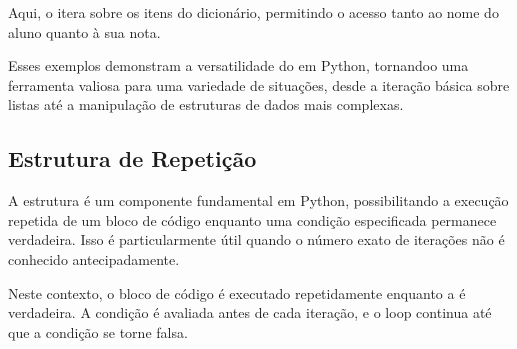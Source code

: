 \documentclass[letterpaper,10pt,english]{jupyterBook}
\begin{document}
\sphinxAtStartPar
Aqui, o  itera sobre os itens do dicionário, permitindo o acesso tanto ao nome do aluno quanto à sua nota.

\sphinxAtStartPar
Esses exemplos demonstram a versatilidade do  em Python, tornando\sphinxhyphen{}o uma ferramenta valiosa para uma variedade de situações, desde a iteração básica sobre listas até a manipulação de estruturas de dados mais complexas.


\subsection{Estrutura de Repetição }
\label{\detokenize{chapters/ch4/ch4:estrutura-de-repeticao-while}}
\sphinxAtStartPar
A estrutura  é um componente fundamental em Python, possibilitando a execução repetida de um bloco de código enquanto uma condição especificada permanece verdadeira. Isso é particularmente útil quando o número exato de iterações não é conhecido antecipadamente.

\sphinxAtStartPar
{}

\begin{sphinxVerbatim}[commandchars=\\\{\}]
 
\end{sphinxVerbatim}

\sphinxAtStartPar
Neste contexto, o bloco de código é executado repetidamente enquanto a  é verdadeira. A condição é avaliada antes de cada iteração, e o loop continua até que a condição se torne falsa.

\sphinxAtStartPar
{}

\begin{sphinxVerbatim}[commandchars=\\\{\}]
  
   
      
\end{sphinxVerbatim}

\sphinxAtStartPar
{}
\end{document}
